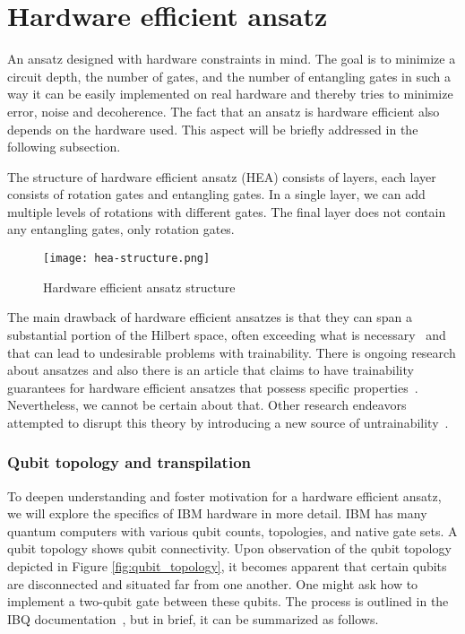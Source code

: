 \section{Hardware efficient ansatz}
An ansatz designed with hardware constraints in mind. The goal is to minimize a circuit depth, the number of gates, and the number of entangling gates in such a way it can be easily implemented on real hardware and thereby tries to minimize error, noise and decoherence. The fact that an ansatz is hardware efficient also depends on the hardware used. This aspect will be briefly addressed in the following subsection.

The structure of hardware efficient ansatz (HEA) consists of layers, each layer consists of rotation gates and entangling gates. In a single layer, we can add multiple levels of rotations with different gates. The final layer does not contain any entangling gates, only rotation gates. 

\begin{figure}[H]
    \centering
    \texttt{[image: hea-structure.png]}       
    \caption{Hardware efficient ansatz structure~\cite{img:hea}}     
\end{figure}
The main drawback of hardware efficient ansatzes is that they can span a substantial portion of the Hilbert space, often exceeding what is necessary~\cite{holmes2022} and that can lead to undesirable problems with trainability. There is ongoing research about ansatzes and also there is an article that claims to have trainability guarantees for hardware efficient ansatzes that possess specific properties~\cite{shallow}. Nevertheless, we cannot be certain about that. Other research endeavors attempted to disrupt this theory by introducing a new source of untrainability~\cite{hea-practical}.

\subsubsection{Qubit topology and transpilation}
To deepen understanding and foster motivation for a hardware efficient ansatz, we will explore the specifics of IBM hardware in more detail. IBM has many quantum computers with various qubit counts, topologies, and native gate sets. A qubit topology shows qubit connectivity. Upon observation of the qubit topology depicted in Figure \ref{fig:qubit_topology}, it becomes apparent that certain qubits are disconnected and situated far from one another. One might ask how to implement a two-qubit gate between these qubits. The process is outlined in the IBQ documentation~\cite{transpiler,native_gates}, but in brief, it can be summarized as follows.

